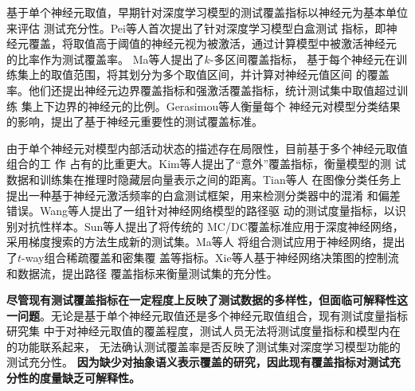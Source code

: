 \fi






{基于单个神经元取值}，早期针对深度学习模型的测试覆盖指标以神经元为基本单位来评估
测试充分性。Pei等人首次提出了针对深度学习模型白盒测试
指标，即神经元覆盖，将取值高于阈值的神经元视为被激活，通过计算模型中被激活神经元
的比率作为测试覆盖率。 Ma等人提出了$k$-多区间覆盖指标，
基于每个神经元在训练集上的取值范围，将其划分为多个取值区间，并计算对神经元值区间
的覆盖率。他们还提出神经元边界覆盖指标和强激活覆盖指标，统计测试集中取值超过训练
集上下边界的神经元的比例。Gerasimou等人衡量每个
神经元对模型分类结果的影响，提出了基于神经元重要性的测试覆盖标准。

由于单个神经元对模型内部活动状态的描述存在局限性，目前基于多个神经元取值组合的工
作
占有的比重更大。Kim等人提出了“意外”覆盖指标，衡量模型的测
试数据和训练集在推理时隐藏层向量表示之间的距离。Tian等人
在图像分类任务上提出一种基于神经元激活频率的白盒测试框架，用来检测分类器中的混淆
和偏差错误。Wang等人提出了一组针对神经网络模型的路径驱
动的测试度量指标，以识别对抗性样本。Sun等人提出了将传统的
MC/DC覆盖标准应用于深度神经网络，采用梯度搜索的方法生成新的测试集。Ma等人
将组合测试应用于神经网络，提出了$t$-way组合稀疏覆盖和密集覆
盖等指标。Xie等人基于神经网络决策图的控制流和数据流，提出路径
覆盖指标来衡量测试集的充分性。

\textbf{尽管现有测试覆盖指标在一定程度上反映了测试数据的多样性，但面临可解释性这
一问题}。无论是基于单个神经元取值还是多个神经元取值组合，现有测试度量指标研究集
中于对神经元取值的覆盖程度，测试人员无法将测试度量指标和模型内在的功能联系起来，
无法确认测试覆盖率是否反映了测试集对深度学习模型功能的测试充分性。
\textbf{因为缺少对抽象语义表示覆盖的研究，因此现有覆盖指标对测试充分性的度量缺乏可解释性。}

